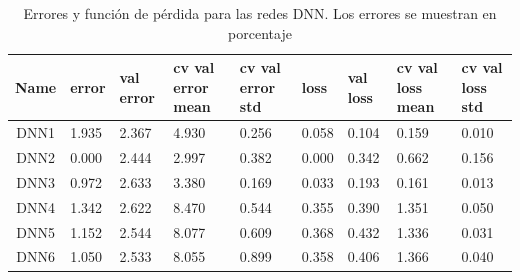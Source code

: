 \documentclass[11pt]{article}
\begin{document}
\begin{table}[H]
    \centering
    \begin{tabular}{c| p{1.5cm}| p{1.5cm}| p{1.5cm}| p{1.5cm}| p{1.5cm}| p{1.5cm}| p{1.5cm}| p{1.5cm}}
        \toprule
        Name &  error &  val error &  cv val error mean &  cv val error std &  loss &  val loss &  cv val loss mean &  cv val loss std \\
        \midrule
        DNN1 &  1.935 &      2.367 &              4.930 &             0.256 & 0.058 &     0.104 &             0.159 &            0.010 \\
        DNN2 &  0.000 &      2.444 &              2.997 &             0.382 & 0.000 &     0.342 &             0.662 &            0.156 \\
        DNN3 &  0.972 &      2.633 &              3.380 &             0.169 & 0.033 &     0.193 &             0.161 &            0.013 \\
        DNN4 &  1.342 &      2.622 &              8.470 &             0.544 & 0.355 &     0.390 &             1.351 &            0.050 \\
        DNN5 &  1.152 &      2.544 &              8.077 &             0.609 & 0.368 &     0.432 &             1.336 &            0.031 \\
        DNN6 &  1.050 &      2.533 &              8.055 &             0.899 & 0.358 &     0.406 &             1.366 &            0.040 \\
        \bottomrule
        \end{tabular}
        \caption{Errores y función de pérdida para las redes DNN. Los errores se muestran en porcentaje}
        \label{tab:DNNres}
\end{table}
\end{document}
